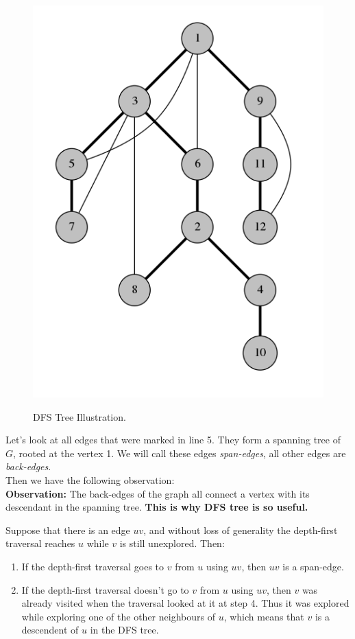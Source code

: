 \documentclass{article}
\begin{document}
\begin{figure}[H]

\centering
\includegraphics[scale=.5]{dfstreeDemo.png}\\[0.2cm] %
\caption{DFS Tree Illustration.}

\end{figure}

Let's look at all edges that were marked in line 5. They form a spanning tree of $G$, rooted at the vertex 1. We will call these edges \emph{span-edges}, all other edges are \emph{back-edges}.\\

Then we have the following observation:\\

\textbf{Observation:} The back-edges of the graph all connect a vertex with its descendant in the spanning tree. \textbf{This is why DFS tree is so useful.}

\begin{remark}
    \Remark Suppose that there is an edge $uv$, and without loss of generality the depth-first traversal reaches $u$ while $v$ is still unexplored. Then:
    \begin{enumerate}[$\bullet$]
        \item If the depth-first traversal goes to $v$ from $u$ using $uv$, then $uv$ is a span-edge.

        \item If the depth-first traversal doesn't go to $v$ from $u$ using $uv$, then $v$ was already visited when the traversal looked at it at step 4. Thus it was explored while exploring one of the other neighbours of $u$, which means that $v$ is a descendent of $u$ in the DFS tree.
    \end{enumerate}
 \end{remark}
\end{document}
